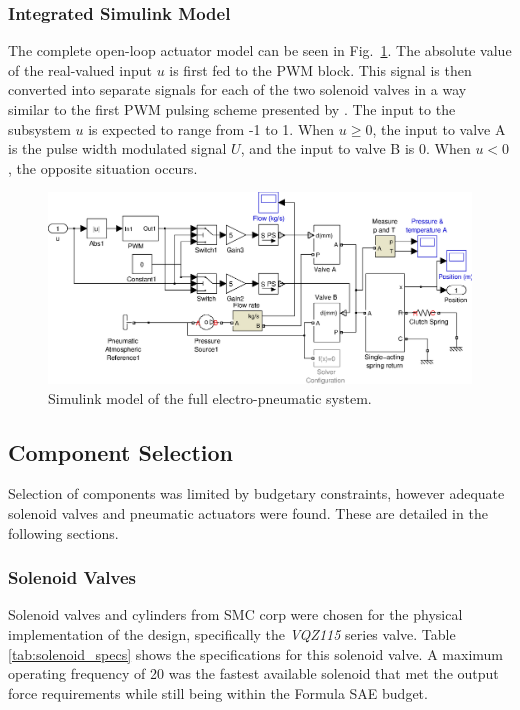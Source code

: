 \subsubsection{Integrated Simulink Model}

The complete open-loop actuator model can be seen in Fig.\ \ref{fig:pneumatics_model_full}. The absolute value of the real-valued input $u$ is first fed to the PWM block. This signal is then converted into separate signals for each of the two solenoid valves in a way similar to the first PWM pulsing scheme presented by \citet{accurate_position}. The input to the subsystem $u$ is expected to range from -1 to 1. When $u\geq0$, the input to valve A is the pulse width modulated signal $U$, and the input to valve B is 0. When $u<0$, the opposite situation occurs.

\begin{figure}[H]
\centering
\includegraphics[scale=0.65]{implementation/figures/pneumatic_modelling4}
\caption{Simulink model of the full electro-pneumatic system.}
\label{fig:pneumatics_model_full}
\end{figure}

\subsection{Component Selection}

Selection of components was limited by budgetary constraints, however adequate solenoid valves and pneumatic actuators were found. These are detailed in the following sections.

\subsubsection{Solenoid Valves}

Solenoid valves and cylinders from SMC corp were chosen for the physical implementation of the design, specifically the \emph{VQZ115} series valve. Table \ref{tab:solenoid_specs} shows the specifications for this solenoid valve. A maximum operating frequency of \unit{20}{\hertz} was the fastest available solenoid that met the output force requirements while still being within the Formula SAE budget.

